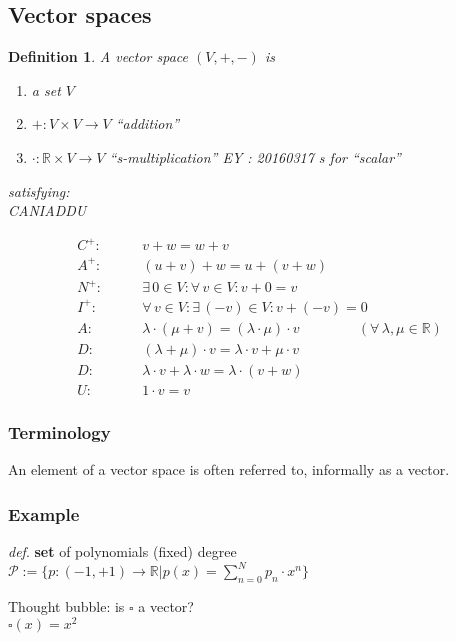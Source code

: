 \documentclass[10pt, twoside]{amsart}
\newtheorem{definition}{Definition}
\begin{document}
\begin{multicols*}{2}
\subsection{Vector spaces}

\begin{definition} A vector space $(V,+,-)$ is 
\begin{enumerate}
  \item[(i)] a set $V$
  \item[(ii)] $+ : V\times V \to V$ \qquad ``addition''
  \item[(iii)] $\cdot : \mathbb{R} \times V \to V$ \qquad  ``s-multiplication'' EY : 20160317 s for ``scalar''
\end{enumerate}
satisfying: \\

CANIADDU

\[
\begin{aligned}
 C^+ : & \qquad v+w = w+v \\
A^+ : & \qquad (u+v)+w = u+(v+w) \\ 
N^+ : & \qquad \exists \, 0 \in V : \forall \, v \in V : v+ 0 = v \\
I^+ : & \qquad \forall \, v \in V : \exists \, (-v) \in V: v + (-v) = 0  \\
A : & \qquad \lambda \cdot (\mu + v) = (\lambda \cdot \mu)\cdot v \qquad \qquad \, (\forall \, \lambda , \mu \in \mathbb{R} ) \\ 
D : &  \qquad (\lambda + \mu ) \cdot v = \lambda \cdot v + \mu \cdot v \\
D : &  \qquad \lambda \cdot v + \lambda \cdot w = \lambda \cdot (v+w)  \\ 
U : &  \qquad 1 \cdot v = v 
\end{aligned}
\]
\end{definition}
\subsubsection*{Terminology} An element of a vector space is often referred to, informally as a vector.  

\subsubsection*{Example}
\emph{def}. \textbf{set} of polynomials (fixed) degree $\mathcal{P} := \lbrace p :(-1,+1) \to \mathbb{R} | p(x) = \sum_{n=0}^N p_n \cdot x^n \rbrace$

Thought bubble: is $\square $ a vector?  \\
\phantom{Thought bubble}$\square(x) = x^2$


\end{multicols*}
\end{document}
